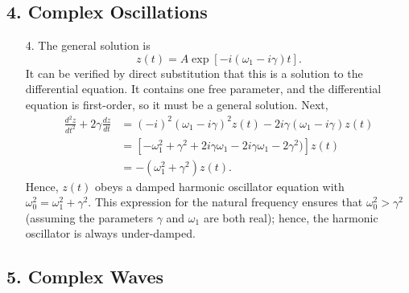 \documentclass[10pt,a4paper]{article}
\begin{document}
\subsection*{4. Complex Oscillations}

\begin{enumerate}
\item[4.]
The general solution is
\begin{equation}
  z(t) = A \exp\left[-i(\omega_1 - i \gamma) t\right].
\end{equation}
It can be verified by direct substitution that this is a solution to
the differential equation. It contains one free parameter, and the
differential equation is first-order, so it must be a general
solution.  Next,
\begin{align}
  \frac{d^2z}{dt^2} + 2 \gamma \frac{dz}{dt} &= (-i)^2(\omega_1 - i\gamma)^2 z(t) - 2i \gamma (\omega_1 - i \gamma) z(t) \\
  &= \left[- \omega_1^2 + \gamma^2 + 2i\gamma\omega_1 - 2i \gamma \omega_1 - 2\gamma^2)\right] z(t) \\
  &= -\left(\omega_1^2 + \gamma^2\right)z(t).
\end{align}
Hence, $z(t)$ obeys a damped harmonic oscillator equation with
$\omega_0^2 = \omega_1^2 + \gamma^2.$ This expression for the natural
frequency ensures that $\omega_0^2 > \gamma^2$ (assuming the
parameters $\gamma$ and $\omega_1$ are both real); hence, the
harmonic oscillator is always under-damped.
\end{enumerate}

\subsection*{5. Complex Waves}
\end{document}
